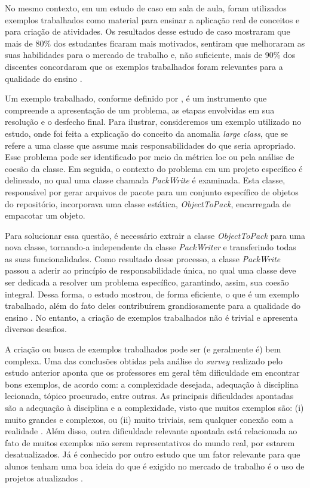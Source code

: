 No mesmo contexto, em um estudo de caso em sala de aula, foram utilizados exemplos trabalhados como material para ensinar a aplicação real de conceitos e para criação de atividades. Os resultados desse estudo de caso mostraram que mais de 80\% dos estudantes ficaram mais motivados, sentiram que melhoraram as suas habilidades para o mercado de trabalho e, não suficiente, mais de 90\% dos discentes concordaram que os exemplos trabalhados foram relevantes para a qualidade do ensino \cite{Simone.Tonhao-etal:2021}.

Um exemplo trabalhado, conforme definido por , é um instrumento que compreende a apresentação de um problema, as etapas envolvidas em sua resolução e o desfecho final. Para ilustrar, consideremos um exemplo utilizado no estudo, onde foi feita a explicação do conceito da anomalia \textit{large class}, que se refere a uma classe que assume mais responsabilidades do que seria apropriado. Esse problema pode ser identificado por meio da métrica \gls{loc} ou pela análise de coesão da classe. Em seguida, o contexto do problema em um projeto específico é delineado, no qual uma classe chamada \textit{PackWrite} é examinada. Esta classe, responsável por gerar arquivos de pacote para um conjunto específico de objetos do repositório, incorporava uma classe estática, \textit{ObjectToPack}, encarregada de empacotar um objeto.

Para solucionar essa questão, é necessário extrair a classe \textit{ObjectToPack} para uma nova classe, tornando-a independente da classe \textit{PackWriter} e transferindo todas as suas funcionalidades. Como resultado desse processo, a classe \textit{PackWrite} passou a aderir ao princípio de responsabilidade única, no qual uma classe deve ser dedicada a resolver um problema específico, garantindo, assim, sua coesão integral. Dessa forma, o estudo mostrou, de forma eficiente, o que é um exemplo trabalhado, além do fato deles contribuírem grandiosamente para a qualidade do ensino \cite{Simone.Tonhao-etal:2021}. No entanto, a criação de exemplos trabalhados não é trivial e apresenta diversos desafios.

A criação ou busca de exemplos trabalhados pode ser (e geralmente é) bem complexa. Uma das conclusões obtidas pela análise do \textit{survey} realizado pelo estudo anterior aponta que os professores em geral têm dificuldade em encontrar bons exemplos, de acordo com: a complexidade desejada, adequação à disciplina lecionada, tópico procurado, entre outras. As principais dificuldades apontadas são a adequação à disciplina e a complexidade, visto que muitos exemplos são: (i) muito grandes e complexos, ou (ii) muito triviais, sem qualquer conexão com a realidade \cite{Simone.Tonhao-etal:2021}. Além disso, outra dificuldade relevante apontada está relacionada ao fato de muitos exemplos não serem representativos do mundo real, por estarem desatualizados. Já é conhecido por outro estudo que um fator relevante para que alunos tenham uma boa ideia do que é exigido no mercado de trabalho é o uso de projetos atualizados \cite{OSSProjects-TheProfessors'Perspective}.

